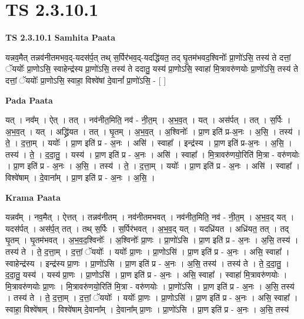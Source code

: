 \documentclass[17pt]{extarticle}
\begin{document}
\section*{ TS 2.3.10.1 }

\textbf{TS 2.3.10.1 } \newline
\textbf{Samhita Paata} \newline

यन्नव॒मैत् तन्नव॑नीतमभव॒द्-यदस॑र्प॒त् तथ् स॒र्पिर॑भव॒द्-यदद्धि॑यत॒ तद् घृ॒तम॑भवद॒श्विनोः᳚ प्रा॒णो॑ऽसि॒ तस्य॑ ते दत्तां॒ ॅययोः᳚ प्रा॒णोऽसि॒ स्वाहेन्द्र॑स्य प्रा॒णो॑ऽसि॒ तस्य॑ ते ददातु॒ यस्य॑ प्रा॒णोऽसि॒ स्वाहा॑ मि॒त्रावरु॑णयोः प्रा॒णो॑ऽसि॒ तस्य॑ ते दत्तां॒ ॅययोः᳚ प्रा॒णोऽसि॒ स्वाहा॒ विश्वे॑षां दे॒वानां᳚ प्रा॒णो॑ऽसि॒ - [  ] \newline

\textbf{Pada Paata} \newline

यत् । नव᳚म् । ऐत् । तत् । नव॑नीत॒मिति॒ नव॑ - नी॒त॒म् । अ॒भ॒व॒त् । यत् । अस॑र्पत् । तत् । स॒र्पिः । अ॒भ॒व॒त् । यत् । अद्ध्रि॑यत । तत् । घृ॒तम् । अ॒भ॒व॒त् । अ॒श्विनोः᳚ । प्रा॒ण इति॑ प्र-अ॒नः । अ॒सि॒ । तस्य॑ । ते॒ । द॒त्ता॒म् । ययोः᳚ । प्रा॒ण इति॑ प्र - अ॒नः । असि॑ । स्वाहा᳚ । इन्द्र॑स्य । प्रा॒ण इति॑ प्र-अ॒नः । अ॒सि॒ । तस्य॑ । ते॒ । द॒दा॒तु॒ । यस्य॑ । प्रा॒ण इति॑ प्र - अ॒नः । असि॑ । स्वाहा᳚ । मि॒त्रावरु॑णयो॒रिति॑ मि॒त्रा - वरु॑णयोः । प्रा॒ण इति॑ प्र - अ॒नः । अ॒सि॒ । तस्य॑ । ते॒ । द॒त्ता॒म् । ययोः᳚ । प्रा॒ण इति॑ प्र - अ॒नः । असि॑ । स्वाहा᳚ । विश्वे॑षाम् । दे॒वाना᳚म् । प्रा॒ण इति॑ प्र - अ॒नः । अ॒सि॒ ।  \newline


\textbf{Krama Paata} \newline

यन्नव᳚म् । नव॒मैत् । ऐत्तत् । तन्नव॑नीतम् । नव॑नीतमभवत् । नव॑नीत॒मिति॒ नव॑ - नी॒त॒म् । अ॒भ॒व॒द् यत् । यदस॑र्पत् । अस॑र्प॒त् तत् । तथ् स॒र्पिः । स॒र्पिर॑भवत् । अ॒भ॒व॒द् यत् । यदध्रि॑यत । अध्रि॑यत॒ तत् । तद् घृ॒तम् । घृ॒तम॑भवत् । अ॒भ॒व॒द॒श्विनोः᳚ । अ॒श्विनोः᳚ प्रा॒णः । प्रा॒णो॑ऽसि । प्रा॒ण इति॑ प्र - अ॒नः । अ॒सि॒ तस्य॑ । तस्य॑ ते । ते॒ द॒त्ता॒म् । द॒त्तां॒ ॅययोः᳚ । ययोः᳚ प्रा॒णः । प्रा॒णोऽसि॑ । प्रा॒ण इति॑ प्र - अ॒नः । असि॒ स्वाहा᳚ । स्वाहेन्द्र॑स्य । इन्द्र॑स्य प्रा॒णः । प्रा॒णो॑ऽसि । प्रा॒ण इति॑ प्र - अ॒नः । अ॒सि॒ तस्य॑ । तस्य॑ ते । ते॒ द॒दा॒तु॒ । द॒दा॒तु॒ यस्य॑ । यस्य॑ प्रा॒णः । प्रा॒णोऽसि॑ । प्रा॒ण इति॑ प्र - अ॒नः । असि॒ स्वाहा᳚ । स्वाहा॑ मि॒त्रावरु॑णयोः । मि॒त्रावरु॑णयोः प्रा॒णः । मि॒त्रावरु॑णयो॒रिति॑ मि॒त्रा - वरु॑णयोः । प्रा॒णो॑ऽसि । प्रा॒ण इति॑ प्र - अ॒नः । अ॒सि॒ तस्य॑ । तस्य॑ ते । ते॒ द॒त्ता॒म् । द॒त्तां॒ ॅययोः᳚ । ययोः᳚ प्रा॒णः । प्रा॒णोऽसि॑ । प्रा॒ण इति॑ प्र - अ॒नः । असि॒ स्वाहा᳚ । स्वाहा॒ विश्वे॑षाम् । विश्वे॑षाम् दे॒वाना᳚म् । दे॒वाना᳚म् प्रा॒णः । प्रा॒णो॑ऽसि । प्रा॒ण इति॑ प्र - अ॒नः । अ॒सि॒ तस्य॑ \newline
\end{document}
